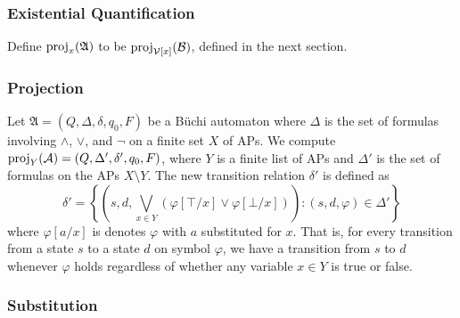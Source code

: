 \subsubsection{Existential Quantification}

\begin{mathpar}
\end{mathpar}

Define $\proj_x(\mathfrak{A})$ to be $\proj_{\mathcal{V}[x]}(\mathcal{B})$, defined in the next section.


\subsubsection{Projection}\label{sec:impl-projection}

Let $\mathfrak{A} = (Q, \Delta, \delta, q_0, F)$ be a B\"uchi automaton where $\Delta$ is the set of formulas involving $\land$, $\lor$, and $\lnot$ on a finite set $X$ of APs.
We compute $\proj_Y(\mathcal{A}) = (Q, \Delta', \delta', q_0, F)$, where $Y$ is a finite list of APs and $\Delta'$ is the set of formulas on the APs $X \setminus Y$.
The new transition relation $\delta'$ is defined as
\[
    \delta' = \left\{ \left( s, d, \bigvee_{x \in Y} (\varphi[\top / x] \lor \varphi[\bot / x])  \right)  : (s, d, \varphi) \in \Delta' \right\}
\]
where $\varphi[a/x]$ is denotes $\varphi$ with $a$ substituted for $x$.
That is, for every transition from a state $s$ to a state $d$ on symbol $\varphi$, we have a transition from $s$ to $d$ whenever $\varphi$ holds regardless of whether any variable $x \in Y$ is true or false.

\subsubsection{Substitution}\label{sec:impl-substitution}

